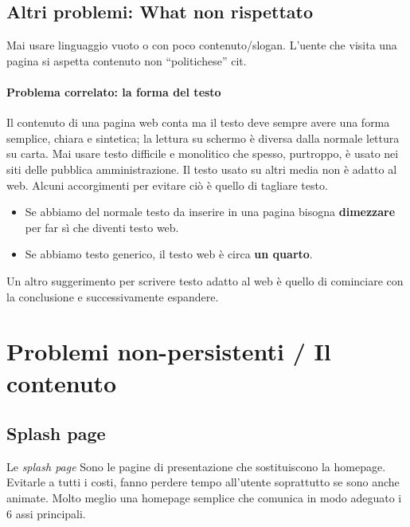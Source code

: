 		\subsection{Altri problemi: What non rispettato}
			Mai usare linguaggio vuoto o con poco contenuto/slogan. L'uente che visita una pagina si aspetta contenuto non ``politichese'' cit.
			
			\paragraph{Problema correlato: la forma del testo}
				Il contenuto di una pagina web conta ma il testo deve sempre avere una forma semplice, chiara e sintetica; la lettura su schermo è diversa dalla normale lettura su carta. Mai usare testo difficile e monolitico che spesso, purtroppo, è usato nei siti delle pubblica amministrazione. Il testo usato su altri media non è adatto al web. Alcuni accorgimenti per evitare ciò è quello di tagliare testo.
				\begin{itemize}
					\item Se abbiamo del normale testo da inserire in una pagina bisogna \textbf{dimezzare} per far sì che diventi testo web.
					\item Se abbiamo testo generico, il testo web è circa \textbf{un quarto}.
				\end{itemize}
				Un altro suggerimento per scrivere testo adatto al web è quello di cominciare con la conclusione e successivamente espandere.
	
	\section{Problemi non-persistenti / Il contenuto}
	
		\subsection{Splash page}
			Le \emph{splash page} Sono le pagine di presentazione che sostituiscono la homepage. Evitarle a tutti i costi, fanno perdere tempo all'utente soprattutto se sono anche animate. Molto meglio una homepage semplice che comunica in modo adeguato i 6 assi principali.
